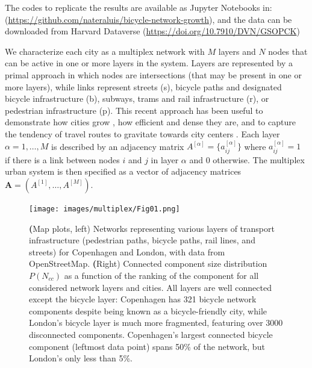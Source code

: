 The codes to replicate the results are available as Jupyter Notebooks in: (\url{https://github.com/nateraluis/bicycle-network-growth}), and the data can be downloaded from Harvard Dataverse (\url{https://doi.org/10.7910/DVN/GSOPCK})

We characterize each city as a multiplex network \cite{Boccaletti2014,Kivela2014,Battiston2017a} with $M$ layers and $N$ nodes that can be active in one or more layers in the system. Layers are represented by a primal approach \cite{Porta2006} in which nodes are intersections (that may be present in one or more layers), while links represent streets (s), bicycle paths and designated bicycle infrastructure (b), subways, trams and rail infrastructure (r), or pedestrian infrastructure (p). This recent approach has been useful to demonstrate how cities grow \cite{Strano2012,Barthelemy2013}, how efficient \cite{Gallotti2014} and dense they are, and to capture the tendency of travel routes to gravitate towards city centers \cite{Lee2017}. Each layer $\alpha=1, \dots, M$ is described by an adjacency matrix $A^{[\alpha]}=\{a_{ij}^{[\alpha]}\}$ where $a_{ij}^{[\alpha]}=1$ if there is a link between nodes $i$ and $j$ in layer $\alpha$ and 0 otherwise. The multiplex urban system is then specified as a vector of adjacency matrices $\textbf{A} = (A^{[1]}, \ldots, A^{[M]})$.


\begin{figure}[t!]
	\centering
	\texttt{[image: images/multiplex/Fig01.png]}
	\caption{{\textbf (Map plots, left)} Networks representing various layers of transport infrastructure (pedestrian paths, bicycle paths, rail lines, and streets) for  Copenhagen and London, with data from OpenStreetMap. {\textbf (Right)} Connected component size distribution $P(N_{cc})$ as a function of the ranking of the component for all considered network layers and cities. All layers are well connected except the bicycle layer: Copenhagen has 321 bicycle network components despite being known as a bicycle-friendly city, while London's bicycle layer is much more fragmented, featuring over 3000 disconnected components. Copenhagen's largest connected bicycle component (leftmost data point) spans 50\% of the network, but London's only less than 5\%.}
	\label{fig:fig01}
\end{figure}

